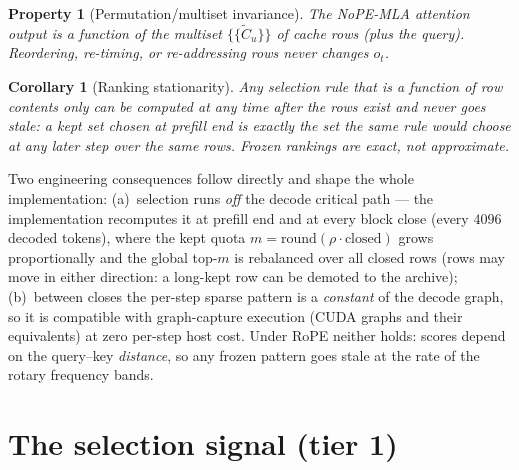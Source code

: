 \documentclass[11pt]{article}
\newtheorem{property}{Property}
\newtheorem{corollary}{Corollary}
\begin{document}
\begin{property}[Permutation/multiset invariance]
The NoPE-MLA attention output is a function of the \emph{multiset}
$\{\!\{\tilde C_u\}\!\}$ of cache rows (plus the query). Reordering,
re-timing, or re-addressing rows never changes $o_t$.
\end{property}

\begin{corollary}[Ranking stationarity]\label{cor:stat}
Any selection rule that is a function of row contents only can be computed
at \emph{any} time after the rows exist and never goes stale: a kept set
chosen at prefill end is exactly the set the same rule would choose at any
later step over the same rows. Frozen rankings are exact, not approximate.
\end{corollary}

Two engineering consequences follow directly and shape the whole
implementation: (a)~selection runs \emph{off} the decode critical path ---
the implementation recomputes it at prefill end and at every block close
(every $4096$ decoded tokens), where the kept quota $m=\mathrm{round}(\rho\cdot\mathrm{closed})$
grows proportionally and the global top-$m$ is rebalanced over all closed
rows (rows may move in either direction: a long-kept row can be demoted to
the archive); (b)~between closes the per-step sparse pattern is a
\emph{constant} of the decode graph, so it is compatible with
graph-capture execution (CUDA graphs and their equivalents) at zero
per-step host cost. Under RoPE neither holds: scores depend on the
query--key \emph{distance}, so any frozen pattern goes stale at the rate of
the rotary frequency bands.

\section{The selection signal (tier 1)}\label{sec:signal}
\end{document}

